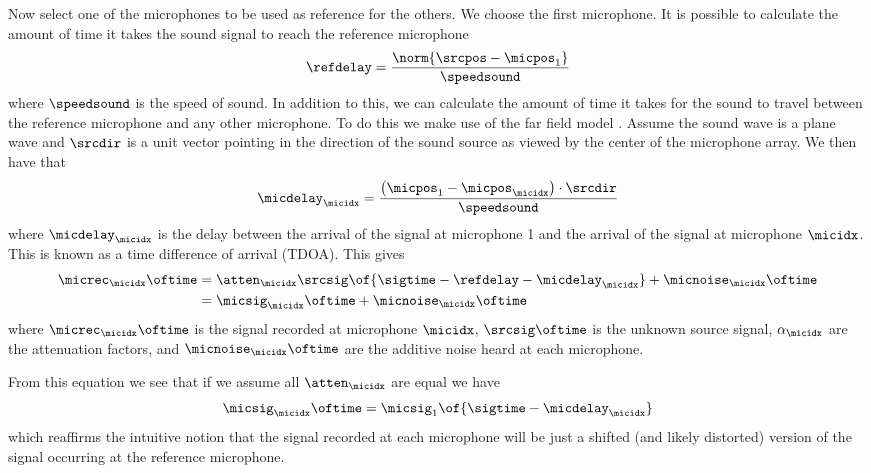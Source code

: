 \documentclass{uiucecethesis09}
\begin{document}
      Now select one of the microphones to be used as reference for the others.  
      We choose the first microphone.  It is possible to calculate the amount of 
      time it takes the sound signal to reach the reference microphone
      \begin{equation} \label{eq:ref_delay} \refdelay = \frac{\norm{\srcpos - 
        \micpos_1}}{\speedsound} \end{equation}
      where $\speedsound$ is the speed of sound.  In addition to this, we can 
      calculate the amount of time it takes for the sound to travel between the 
      reference microphone and any other microphone.  To do this we make use of 
      the far field model \cite{dudgeon1977fundamentals}.  Assume the sound wave 
      is a plane wave and $\srcdir$ is a unit vector pointing in the direction 
      of the sound source as viewed by the center of the microphone array. We 
      then have that
      \begin{equation} \label{eq:TDOA} \micdelay_\micidx = \frac{\left(\micpos_1 
        - \micpos_\micidx\right) \cdot \srcdir}{\speedsound} \end{equation}
      where $\micdelay_\micidx$ is the delay between the arrival of the signal 
      at microphone 1 and the arrival of the signal at microphone $\micidx$.  
      This is known as a time difference of arrival (TDOA).  This gives 
      \begin{align} \label{eq:mic_signal}
        \micrec_\micidx\oftime &= \atten_\micidx\srcsig\of{\sigtime - \refdelay - 
        \micdelay_\micidx} + \micnoise_\micidx\oftime\\
        &= \micsig_\micidx\oftime + \micnoise_\micidx\oftime
      \end{align}
      where $\micrec_\micidx\oftime$ is the signal recorded at microphone $\micidx$, 
      $\srcsig\oftime$ is the unknown source signal, $\alpha_\micidx$ are the 
      attenuation factors, and $\micnoise_\micidx\oftime$ are the additive noise heard 
      at each microphone.

      From this equation we see that if we assume all $\atten_\micidx$ are equal 
      we have
      \begin{equation} \label{eq:sig_shift} \micsig_\micidx\oftime = 
        \micsig_1\of{\sigtime - \micdelay_\micidx} \end{equation}
      which reaffirms the intuitive notion that the signal recorded at each 
      microphone will be just a shifted (and likely distorted) version of the 
      signal occurring at the reference microphone.
      
\end{document}
